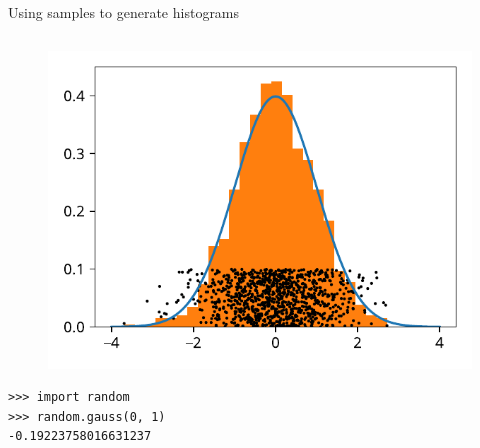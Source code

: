 \documentclass[12pt, aspectratio=149]{beamer}
\theoremstyle{plain}
\begin{document}
\begin{frame}[fragile]{Using samples to generate histograms}
\begin{columns}
\begin{column}{0.5\textwidth}
\begin{center}
\begin{figure}
	 \includegraphics[width=0.99\linewidth]{figures/normal_samples_hist}
 \end{figure}
 \begin{verbatim}
>>> import random
>>> random.gauss(0, 1)
-0.19223758016631237
 \end{verbatim}
 \end{center}
\end{column}
\end{columns}
\end{frame}
\end{document}
